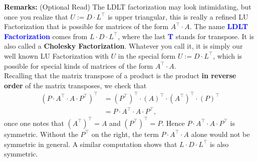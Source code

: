 \vspace*{.2cm} 
\textbf{Remarks:} (Optional Read) The LDLT factorization may look intimidating, but once you realize that $U:=D \cdot L^\top$ is upper triangular, this is really a refined LU Factorization that is possible for matrices of the form $A^\top \cdot A$. The name \textcolor{blue}{\bf LDLT Factorization} comes from $L\cdot D \cdot L^\top$, where the last \textcolor{blue}{\bf T} stands for transpose. It is also called a \textbf{Cholesky Factorization}. Whatever you call it, it is simply our well known LU Factorization with $U$ in the special form  $U:=D \cdot L^\top$, which is possible for special kinds of matrices of the form $A^\top \cdot A$. \\

Recalling that the matrix transpose of a product is the product \textbf{in reverse order} of the matrix transposes, we check that
\begin{align*}
   \left(P\cdot A^\top \cdot A \cdot P^\top \right)^\top &= \left(P^\top \right)^\top \cdot \left(A \right)^\top \cdot \left(A^\top\right)^\top \cdot  \left(P \right)^\top\\
   &= P\cdot A^\top \cdot A \cdot P^\top,
\end{align*}
once one notes that $\left(A^\top\right)^\top =A$ and $\left(P^\top \right)^\top=P$. Hence $P\cdot A^\top \cdot A \cdot P^\top$ is symmetric. Without the $P^\top$ on the right, the term $P\cdot A^\top \cdot A$ alone would not be symmetric in general. A similar computation shows that $L\cdot D \cdot L^\top$ is also symmetric. \Qed

